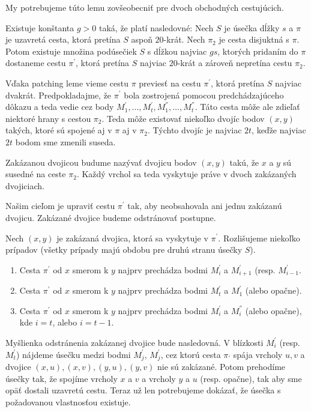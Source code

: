 My potrebujeme túto lemu zovšeobecniť pre dvoch obchodných cestujúcich.

\begin{lema}
Existuje konštanta $g > 0$ taká, že platí nasledovné: Nech $S$ je úsečka dĺžky $s$ a $\pi$ je
uzavretá cesta, ktorá pretína $S$ aspoň $20$-krát. Nech $\pi_2$ je cesta disjuktná s $\pi$.
Potom existuje množina podúsečiek $S$ s dĺžkou najviac
$gs$, ktorých pridaním do $\pi$ dostaneme cestu $\pi^{'}$, ktorá pretína $S$ najviac $20$-krát a
zároveň nepretína cestu $\pi_2$.
\end{lema}

\begin{dokaz}
Vďaka patching leme vieme cestu $\pi$ previesť na cestu $\pi^{'}$, ktorá pretína $S$ najviac
dvakrát. Predpokladajme, že $\pi^{'}$ bola zostrojená pomocou predchádzajúceho dôkazu a teda vedie
cez body $M_1^{'}, \dots, M_t^{'}, M_1^{''}, \dots, M_t^{''}$. Táto cesta môže ale zdieľať niektoré
hrany s cestou $\pi_2$. Teda môže existovať niekoľko dvojíc bodov $(x, y)$ takých, ktoré sú spojené
aj v $\pi$ aj v $\pi_2$. Týchto dvojíc je najviac $2t$, keďže najviac $2t$ bodom sme zmenili suseda. 

Zakázanou dvojicou budume nazývať dvojicu bodov $(x, y)$ takú, že $x$ a $y$ sú susedné na
ceste $\pi_2$. Každý vrchol sa teda vyskytuje práve v dvoch zakázaných dvojiciach.

Našim cieľom je upraviť cestu $\pi^{'}$ tak, aby neobsahovala ani jednu zakázanú dvojicu.
Zakázané dvojice budeme odstránovať postupne.

Nech $(x,y)$ je zakázaná dvojica, ktorá sa vyskytuje v $\pi^{'}$. Rozlišujeme niekoľko prípadov
(všetky prípady majú obdobu pre druhú stranu úsečky $S$).
\begin{enumerate}
\item Cesta $\pi^{'}$ od $x$ smerom k $y$ najprv prechádza bodmi $M_i^{'}$ a $M_{i+1}^{'}$ (resp.
$M_{i-1}^{'}$.
\item Cesta $\pi^{'}$ od $x$ smerom k $y$ najprv prechádza bodmi $M_t^{'}$ a $M_{1}^{'}$ (alebo
opačne).
\item Cesta $\pi^{'}$ od $x$ smerom k $y$ najprv prechádza bodmi $M_i^{'}$ a $M_i^{''}$ (alebo
opačne), kde $i = t$, alebo $i = t-1$.
\end{enumerate}

Myšlienka odstránenia zakázanej dvojice bude nasledovná. V blízkosti $M_i^{'}$ (resp. $M_t^{'}$)
nájdeme úsečku medzi bodmi $M_j^{'}$, $M_j^{'}$, cez ktorú cesta $\pi_{'}$ spája vrcholy $u, v$
a dvojice $(x,u), (x,v), (y,u), (y,v)$ nie sú zakázané. Potom prehodíme úsečky tak, že spojíme
vrcholy $x$ a $v$ a vrcholy $y$ a $u$ (resp. opačne), tak aby sme opäť dostali uzavretú cestu.
Teraz už len potrebujeme dokázať, že úsečka s požadovanou vlastnosťou existuje.


\end{dokaz}
